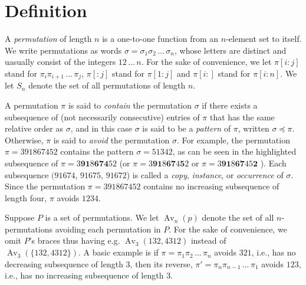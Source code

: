 \documentclass[a4paper]{llncs}
\DeclareMathOperator{\RED}{red}
\DeclareMathOperator{\AV}{Av}
\begin{document}
	
\section{Definition}
\label{section:Definitions}


A \emph{permutation} of length $n$ is a one-to-one function from an
$n$-element set to itself.
We write permutations as words 
$\sigma = \sigma_1\sigma_2\,\ldots\,\sigma_n$, whose letters are distinct
and uasually consist of the integers $12\,\ldots\,n$.
For the sake of convenience, 
we let 
$\pi[i:j]$ stand for 
$\pi_i\pi_{i+1}\,\ldots\,\pi_j$,
$\pi[:j]$ stand for $\pi[1:j]$ and
$\pi[i:]$ stand for $\pi[i:n]$.
We let $S_n$ denote the set of all permutations of length $n$.


A permutation $\pi$ is said to \emph{contain} the permutation $\sigma$ 
if there exists a subsequence of (not necessarily consecutive) 
entries of $\pi$ that has the same relative order as $\sigma$, 
and in this case $\sigma$ is said to be a \emph{pattern} of 
$\pi$, written $\sigma \preceq \pi$. 
Otherwise, $\pi$ is said to \emph{avoid} the permutation $\sigma$. 
For example, the permutation $\pi = 391867452$ 
contains the pattern $\sigma = 51342$, 
as can be seen in the highlighted subsequence of 
$\pi = 3\mathbf{9}\mathbf{1}8\mathbf{6}\mathbf{7}\mathbf{4}52$
(or 
$\pi = 3\mathbf{9}\mathbf{1}8\mathbf{6}\mathbf{7}4\mathbf{5}2$
or
$\pi = 3\mathbf{9}\mathbf{1}8\mathbf{6}\mathbf{7}45\mathbf{2}$
). 
Each subsequence $(91674$, 
$91675$, 
$91672$) is called a 
\emph{copy}, 
\emph{instance}, or 
\emph{occurrence} of $\sigma$. 
Since the permutation $\pi = 391867452$  contains no increasing subsequence of length four, $\pi$ avoids $1234$.

Suppose $P$ is a set of permutations. We let $\AV_n(p)$ denote the
set of all $n$-permutations avoiding each permutation in $P$.
For the sake of convenience, we omit $P$'s braces thus having
e.g. $\AV_3(132,4312)$ instead of
$\AV_3(\{132,4312\})$.
A basic example is if 
$\pi = \pi_1\pi_2\,\ldots\,\pi_n$ avoids $321$, i.e., 
has no decreasing subsequence of length $3$, then its reverse, 
$\pi' = \pi_n\pi_{n-1}\,\ldots\,\pi_1$ avoids $123$, i.e., 
has no increasing subsequence of length $3$.
\end{document}
